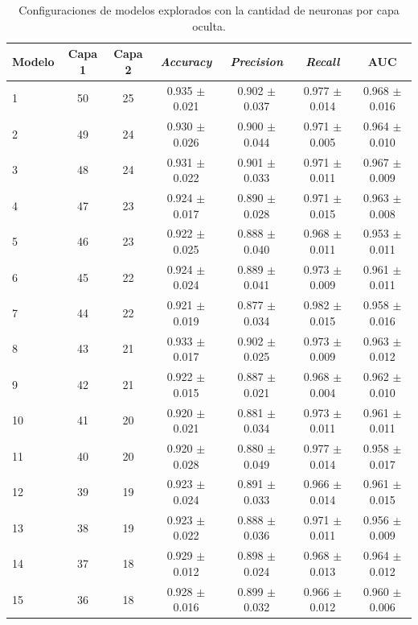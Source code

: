 \begin{table}[H]
	\centering
	\caption[Configuraciones de modelos explorados]{Configuraciones de modelos explorados con la cantidad de neuronas por capa oculta.}
	\begin{tabular}{l c c c c c c}    
		\toprule
		\textbf{Modelo} & \textbf{Capa 1} & \textbf{Capa 2} & \textbf{\emph{Accuracy}} & \textbf{\emph{Precision}} & \textbf{\emph{Recall}}  & \textbf{AUC}\\
		\midrule
    
      1 & 50 & 25	& 0.935 $\pm$ 0.021 & 0.902  $\pm$ 0.037	& 0.977  $\pm$ 0.014 & 0.968  $\pm$ 0.016\\
      2 & 49 & 24 & 0.930 $\pm$ 0.026 & 0.900  $\pm$ 0.044 & 0.971  $\pm$ 0.005 & 0.964 $\pm$ 0.010\\
      3 & 48 & 24 & 0.931 $\pm$ 0.022 & 0.901 $\pm$ 0.033 & 0.971 $\pm$ 0.011 & 0.967 $\pm$ 0.009\\
      4 & 47 & 23 & 0.924 $\pm$ 0.017 & 0.890 $\pm$ 0.028 & 0.971 $\pm$ 0.015 & 0.963 $\pm$ 0.008\\
      5 & 46 & 23 & 0.922 $\pm$ 0.025 & 0.888 $\pm$ 0.040 & 0.968 $\pm$ 0.011 & 0.953 $\pm$ 0.011\\
      6 & 45 & 22 & 0.924 $\pm$ 0.024 & 0.889 $\pm$ 0.041 & 0.973 $\pm$ 0.009 & 0.961 $\pm$ 0.011\\ 
      7 & 44 & 22 & 0.921 $\pm$ 0.019 & 0.877 $\pm$ 0.034 & 0.982 $\pm$ 0.015 & 0.958 $\pm$ 0.016\\ 
      8 & 43 & 21 & 0.933 $\pm$ 0.017 & 0.902 $\pm$ 0.025 & 0.973 $\pm$ 0.009 & 0.963 $\pm$ 0.012\\ 
      9 & 42 & 21 & 0.922 $\pm$ 0.015 & 0.887 $\pm$ 0.021 & 0.968 $\pm$ 0.004 & 0.962 $\pm$ 0.010\\ 
      10 & 41 & 20 & 0.920 $\pm$ 0.021 & 0.881 $\pm$ 0.034 & 0.973 $\pm$ 0.011 & 0.961 $\pm$ 0.011\\ 
      11 & 40 & 20 & 0.920 $\pm$ 0.028 & 0.880 $\pm$ 0.049 & 0.977 $\pm$ 0.014 & 0.958 $\pm$ 0.017\\ 
      12 & 39 & 19 & 0.923 $\pm$ 0.024 & 0.891 $\pm$ 0.033 & 0.966 $\pm$ 0.014 & 0.961 $\pm$ 0.015\\ 
      13 & 38 & 19 & 0.923 $\pm$ 0.022 & 0.888 $\pm$ 0.036 & 0.971 $\pm$ 0.011 & 0.956 $\pm$ 0.009\\ 
      14 & 37 & 18 & 0.929 $\pm$ 0.012 & 0.898 $\pm$ 0.024 & 0.968 $\pm$ 0.013 & 0.964 $\pm$ 0.012\\ 
      15 & 36 & 18 & 0.928 $\pm$ 0.016 & 0.899 $\pm$ 0.032 & 0.966 $\pm$ 0.012 & 0.960 $\pm$ 0.006\\ 

\end{tabular}
\end{table}
